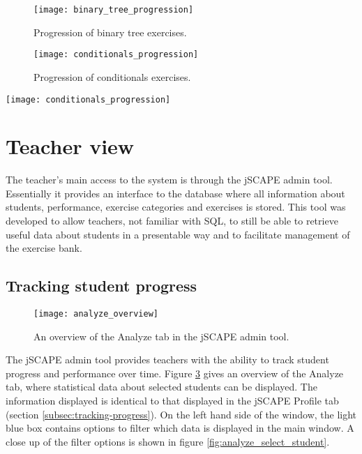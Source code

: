 \newpage
\begin{figure}[H]
\centering
\texttt{[image: binary\_tree\_progression]}
\caption{Progression of binary tree exercises.}
\label{fig:binary_tree_progression}
\end{figure}

\begin{figure}[H]
\centering
\texttt{[image: conditionals\_progression]}
\caption{Progression of conditionals exercises.}
\label{fig:conditionals_progression}
\end{figure}

\begin{sidewaysfigure}
\centering
\texttt{[image: conditionals\_progression]}
\caption{Progression of conditionals exercises.}
\label{fig:conditionals_progression}
\end{sidewaysfigure}

\section{Teacher view}
The teacher's main access to the system is through the jSCAPE admin tool. Essentially it provides an interface to the database where all information about students, performance, exercise categories and exercises is stored. This tool was developed to allow teachers, not familiar with SQL, to still be able to retrieve useful data about students in a presentable way and to facilitate management of the exercise bank.

\subsection{Tracking student progress}
\begin{figure}[H]
\centering
\texttt{[image: analyze\_overview]}
\caption{An overview of the Analyze tab in the jSCAPE admin tool.}
\label{fig:analyze_overview}
\end{figure}

The jSCAPE admin tool provides teachers with the ability to track student progress and performance over time. Figure \ref{fig:analyze_overview} gives an overview of the Analyze tab, where statistical data about selected students can be displayed. The information displayed is identical to that displayed in the jSCAPE Profile tab (section \ref{subsec:tracking-progress}). On the left hand side of the window, the light blue box contains options to filter which data is displayed in the main window. A close up of the filter options is shown in figure \ref{fig:analyze_select_student}.


